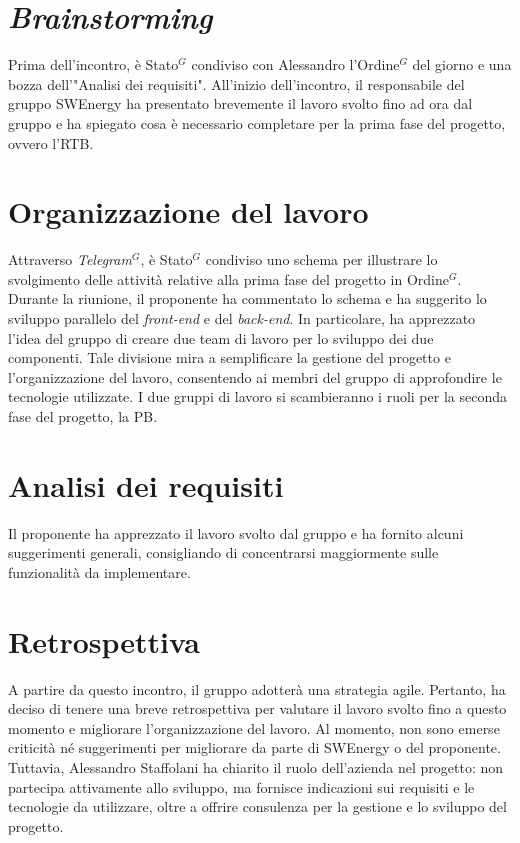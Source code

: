 \section{\textit{Brainstorming}}

Prima dell'incontro, è \gls{Stato}$^G$ condiviso con Alessandro l'\gls{Ordine}$^G$ del giorno e 
una bozza dell'"Analisi dei requisiti". All'inizio dell'incontro, il 
responsabile del gruppo SWEnergy ha presentato brevemente il lavoro svolto 
fino ad ora dal gruppo e ha spiegato cosa è necessario completare per la prima 
fase del progetto, ovvero l'RTB.

\section{Organizzazione del lavoro}

Attraverso \textit{\gls{Telegram}$^G$}, è \gls{Stato}$^G$ condiviso uno schema per illustrare lo 
svolgimento delle attività relative alla prima fase del progetto in \gls{Ordine}$^G$. 
Durante la riunione, il proponente ha commentato lo schema e ha suggerito lo 
sviluppo parallelo del \textit{front-end} e del \textit{back-end}. In 
particolare, ha apprezzato l'idea del gruppo di creare due team di lavoro per lo 
sviluppo dei due componenti. Tale divisione mira a semplificare la gestione del 
progetto e l'organizzazione del lavoro, consentendo ai membri del gruppo di 
approfondire le tecnologie utilizzate. I due gruppi di lavoro si scambieranno 
i ruoli per la seconda fase del progetto, la PB.

\section{Analisi dei requisiti}

Il proponente ha apprezzato il lavoro svolto dal gruppo e ha fornito alcuni 
suggerimenti generali, consigliando di concentrarsi maggiormente sulle 
funzionalità da implementare.

\section{Retrospettiva}

A partire da questo incontro, il gruppo adotterà una strategia agile. Pertanto, 
ha deciso di tenere una breve retrospettiva per valutare il lavoro svolto fino a 
questo momento e migliorare l'organizzazione del lavoro. Al momento, non sono 
emerse criticità né suggerimenti per migliorare da parte di SWEnergy o del 
proponente. Tuttavia, Alessandro Staffolani ha chiarito il ruolo dell'azienda nel 
progetto: non partecipa attivamente allo sviluppo, ma fornisce indicazioni sui 
requisiti e le tecnologie da utilizzare, oltre a offrire consulenza per la 
gestione e lo sviluppo del progetto.

